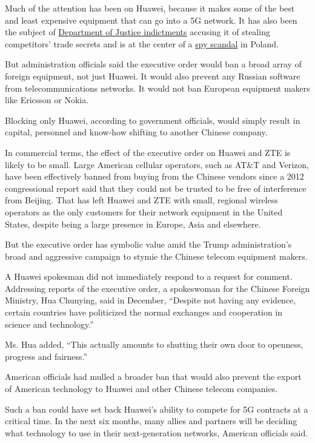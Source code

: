 Much of the attention has been on Huawei, because it makes some of the
best and least expensive equipment that can go into a 5G network. It has
also been the subject of
\href{https://www.nytimes.com/2019/01/28/us/politics/meng-wanzhou-huawei-iran.html}{Department
of Justice indictments} accusing it of stealing competitors' trade
secrets and is at the center of a
\href{https://www.nytimes.com/2019/01/11/world/europe/poland-china-huawei-spy.html}{spy
scandal} in Poland.

But administration officials said the executive order would ban a broad
array of foreign equipment, not just Huawei. It would also prevent any
Russian software from telecommunications networks. It would not ban
European equipment makers like Ericsson or Nokia.

Blocking only Huawei, according to government officials, would simply
result in capital, personnel and know-how shifting to another Chinese
company.

In commercial terms, the effect of the executive order on Huawei and ZTE
is likely to be small. Large American cellular operators, such as AT\&T
and Verizon, have been effectively banned from buying from the Chinese
vendors since a 2012 congressional report said that they could not be
trusted to be free of interference from Beijing. That has left Huawei
and ZTE with small, regional wireless operators as the only customers
for their network equipment in the United States, despite being a large
presence in Europe, Asia and elsewhere.

But the executive order has symbolic value amid the Trump
administration's broad and aggressive campaign to stymie the Chinese
telecom equipment makers.

A Huawei spokesman did not immediately respond to a request for comment.
Addressing reports of the executive order, a spokeswoman for the Chinese
Foreign Ministry, Hua Chunying, said in December, ``Despite not having
any evidence, certain countries have politicized the normal exchanges
and cooperation in science and technology.''

Ms. Hua added, ``This actually amounts to shutting their own door to
openness, progress and fairness.''

American officials had mulled a broader ban that would also prevent the
export of American technology to Huawei and other Chinese telecom
companies.

Such a ban could have set back Huawei's ability to compete for 5G
contracts at a critical time. In the next six months, many allies and
partners will be deciding what technology to use in their
next-generation networks, American officials said.

